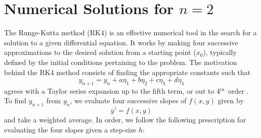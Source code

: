 \documentclass[12pt, manuscript]{article}
\begin{document}
\section*{Numerical Solutions for $n = 2$}
    The Runge-Kutta method (RK4) is an effective numerical tool in the search for a solution to a given differential equation. It works by making four successive approximations to the desired solution from a starting point ($x_{0}$), typically defined by the initial conditions pertaining to the problem.
    The motivation behind the RK4 method consists of finding the appropriate constants such that 
    \begin{equation}
        y_{n+1} = y_n + a\eta_1 + b\eta_2 + c\eta_3 + d\eta_4
    \end{equation}
    agrees with a Taylor series expansion up to the fifth term, or out to $4^{\text{\tiny{th}}}$ order \cite{zill}. To find $y_{n+1}$ from $y_n$, we evaluate four successive slopes of $f(x, y)$ given by
    \begin{equation}
        y' = f(x, y)
    \end{equation}
    and take a weighted average. In order, we follow the following prescription \cite{blanch} for evaluating the four slopes given a step-size $h$:
\end{document}
